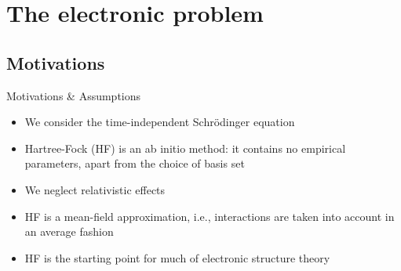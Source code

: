 \documentclass[aspectratio=169,9pt]{beamer}
\begin{document}
\section{The electronic problem}
\subsection{Motivations}
\begin{frame}{Motivations \& Assumptions}
	\begin{itemize}
		\item We consider the \alert{time-independent} Schr\"odinger equation
		\bigskip
		\item Hartree-Fock (HF) is an \alert{ab initio method}: it contains no empirical parameters, apart from the choice of basis set
		\bigskip
		\item We neglect \alert{relativistic effects}
		\bigskip
		\item HF is a \alert{mean-field approximation}, i.e., interactions are taken into account in an average fashion
		\bigskip
		\item \alert{HF is the starting point for much of electronic structure theory}
	\end{itemize}
\end{frame}

\end{document}
